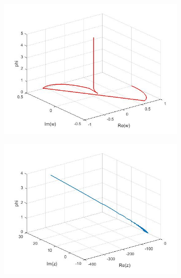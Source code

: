 \documentclass[a4paper,11pt]{article}
\begin{document}
\begin{figure}[!h]
\begin{subfigure}[c]{0.5\textwidth}
\end{subfigure}
\begin{subfigure}[c]{0.5\textwidth}
\includegraphics[width=\linewidth]{12.jpg}
\end{subfigure}
\begin{subfigure}[c]{0.5\textwidth}
\includegraphics[width=\linewidth]{17.jpg}
\end{subfigure}
\begin{subfigure}[c]{0.5\textwidth}

\end{subfigure}
\end{figure}
\end{document}
